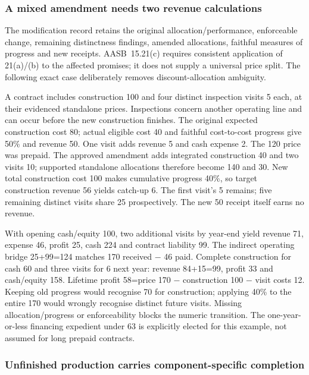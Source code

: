 \hypertarget{a-mixed-amendment-needs-two-revenue-calculations}{%
\subsubsection{A mixed amendment needs two revenue calculations}\label{a-mixed-amendment-needs-two-revenue-calculations}}

The modification record retains the original allocation/performance, enforceable change, remaining distinctness findings, amended allocations, faithful measures of progress and new receipts. AASB~15.21(c) \citep[paras.~18--21,39--45,73--90]{aasb15dated} requires consistent application of 21(a)/(b) to the affected promises; it does not supply a universal price split. The following exact case deliberately removes discount-allocation ambiguity.

A contract includes construction 100 and four distinct inspection visits 5 each, at their evidenced standalone prices. Inspections concern another operating line and can occur before the new construction finishes. The original expected construction cost 80; actual eligible cost 40 and faithful cost-to-cost progress give 50\% and revenue 50. One visit adds revenue 5 and cash expense 2. The 120 price was prepaid. The approved amendment adds integrated construction 40 and two visits 10; supported standalone allocations therefore become 140 and 30. New total construction cost 100 makes cumulative progress 40\%, so target construction revenue 56 yields catch-up 6. The first visit's 5 remains; five remaining distinct visits share 25 prospectively. The new 50 receipt itself earns no revenue.

With opening cash/equity 100, two additional visits by year-end yield revenue 71, expense 46, profit 25, cash 224 and contract liability 99. The indirect operating bridge 25+99=124 matches 170 received − 46 paid. Complete construction for cash 60 and three visits for 6 next year: revenue 84+15=99, profit 33 and cash/equity 158. Lifetime profit 58=price 170 − construction 100 − visit costs 12. Keeping old progress would recognise 70 for construction; applying 40\% to the entire 170 would wrongly recognise distinct future visits. Missing allocation/progress or enforceability blocks the numeric transition. The one-year-or-less financing expedient under 63 is explicitly elected for this example, not assumed for long prepaid contracts.

\hypertarget{unfinished-production-carries-component-specific-completion}{%
\subsubsection{Unfinished production carries component-specific completion}\label{unfinished-production-carries-component-specific-completion}}

